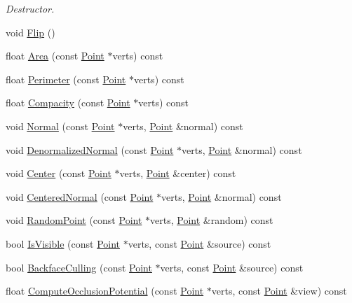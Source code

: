 \begin{DoxyCompactItemize}
\begin{DoxyCompactList}\small\item\em Destructor. \end{DoxyCompactList}\item 
void \hyperlink{class_indexed_triangle_a1f62befd6484bee954f067d5738c38a5}{Flip} ()
\item 
float \hyperlink{class_indexed_triangle_a726d46253ceaef9e3724d195374c1050}{Area} (const \hyperlink{class_point}{Point} $\ast$verts) const 
\item 
float \hyperlink{class_indexed_triangle_ab089bb99995ef572f42401d65868104f}{Perimeter} (const \hyperlink{class_point}{Point} $\ast$verts) const 
\item 
float \hyperlink{class_indexed_triangle_aa6fc9a36d7d895f5b23de439d7474e94}{Compacity} (const \hyperlink{class_point}{Point} $\ast$verts) const 
\item 
void \hyperlink{class_indexed_triangle_aec07600ca093248c4e49d02b3f2f7a36}{Normal} (const \hyperlink{class_point}{Point} $\ast$verts, \hyperlink{class_point}{Point} \&normal) const 
\item 
void \hyperlink{class_indexed_triangle_a6077f4cb876cdbbef181d4501d5b28f7}{Denormalized\+Normal} (const \hyperlink{class_point}{Point} $\ast$verts, \hyperlink{class_point}{Point} \&normal) const 
\item 
void \hyperlink{class_indexed_triangle_a773a19dac0e1b35913f94b8ec08f638d}{Center} (const \hyperlink{class_point}{Point} $\ast$verts, \hyperlink{class_point}{Point} \&center) const 
\item 
void \hyperlink{class_indexed_triangle_a307ff86b3dcb63701e4805ced9a21730}{Centered\+Normal} (const \hyperlink{class_point}{Point} $\ast$verts, \hyperlink{class_point}{Point} \&normal) const 
\item 
void \hyperlink{class_indexed_triangle_ad2fc2080a0d1ead335836991822eeca2}{Random\+Point} (const \hyperlink{class_point}{Point} $\ast$verts, \hyperlink{class_point}{Point} \&random) const 
\item 
bool \hyperlink{class_indexed_triangle_a6fc8b09c9cc16ce1e7c0b3fd825ddbf2}{Is\+Visible} (const \hyperlink{class_point}{Point} $\ast$verts, const \hyperlink{class_point}{Point} \&source) const 
\item 
bool \hyperlink{class_indexed_triangle_acac72a5c7e3a7e7963a9e9bc4ed2a3e8}{Backface\+Culling} (const \hyperlink{class_point}{Point} $\ast$verts, const \hyperlink{class_point}{Point} \&source) const 
\item 
float \hyperlink{class_indexed_triangle_a4df6adef9fba2d9426e13f03a12b0ea1}{Compute\+Occlusion\+Potential} (const \hyperlink{class_point}{Point} $\ast$verts, const \hyperlink{class_point}{Point} \&view) const 

\end{DoxyCompactItemize}

